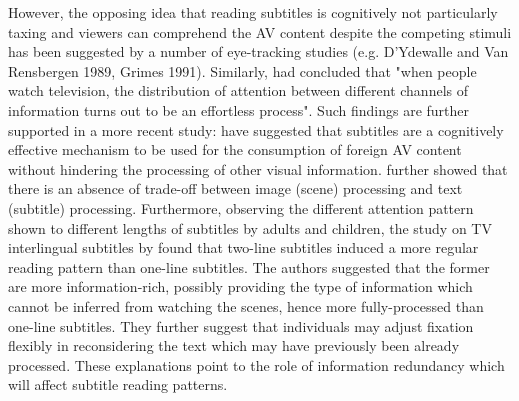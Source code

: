 \documentclass[output=paper]{langsci/langscibook}
\begin{document}
However, the opposing idea that reading subtitles is cognitively not particularly taxing and viewers can comprehend the AV content despite the competing stimuli has been suggested by a number of eye-tracking studies (e.g. D'Ydewalle and Van Rensbergen 1989, Grimes 1991). Similarly, \citet[pg. 425]{dydewalle1992} had concluded that "when people watch television, the distribution of attention between different channels of information turns out to be an effortless process". Such findings are further supported in a more recent study: \citet{perego2010} have suggested that subtitles are a cognitively effective mechanism to be used for the consumption of foreign AV content without hindering the processing of other visual information. \citet{perego2010} further showed that there is an absence of trade-off between image (scene) processing and text (subtitle) processing. Furthermore, observing the different attention pattern shown to different lengths of subtitles by adults and children, the study on TV interlingual subtitles by \citet{Bruycker2007} found that two-line subtitles induced a more regular reading pattern than one-line subtitles. The authors suggested that the former are more information-rich, possibly providing the type of information which cannot be inferred from watching the scenes, hence more fully-processed than one-line subtitles. They further suggest that individuals may adjust fixation flexibly in reconsidering the text which may have previously been already processed.  These explanations point to the role of information redundancy which will affect subtitle reading patterns.
\end{document}
